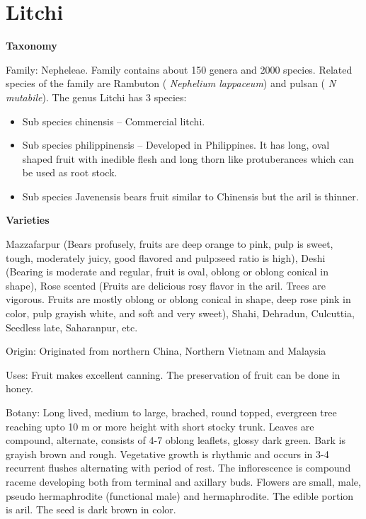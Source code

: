 \documentclass[
  openany]{book}
\providecommand{\tightlist}{%
  \setlength{\itemsep}{0pt}\setlength{\parskip}{0pt}}
\begin{document}
\hypertarget{litchi}{%
\section{Litchi}\label{litchi}}

\textbf{Taxonomy}

Family: Nepheleae. Family contains about 150 genera and 2000 species. Related species of the family are Rambuton ( \emph{Nephelium lappaceum}) and pulsan ( \emph{N mutabile}). The genus Litchi has 3 species:

\begin{itemize}
\tightlist
\item
  Sub species chinensis -- Commercial litchi.
\item
  Sub species philippinensis -- Developed in Philippines. It has long, oval shaped fruit with inedible flesh and long thorn like protuberances which can be used as root stock.
\item
  Sub species Javenensis bears fruit similar to Chinensis but the aril is thinner.
\end{itemize}

\textbf{Varieties}

Mazzafarpur (Bears profusely, fruits are deep orange to pink, pulp is sweet, tough, moderately juicy, good flavored and pulp:seed ratio is high), Deshi (Bearing is moderate and regular, fruit is oval, oblong or oblong conical in shape), Rose scented (Fruits are delicious rosy flavor in the aril. Trees are vigorous. Fruits are mostly oblong or oblong conical in shape, deep rose pink in color, pulp grayish white, and soft and very sweet), Shahi, Dehradun, Culcuttia, Seedless late, Saharanpur, etc.

Origin: Originated from northern China, Northern Vietnam and Malaysia

Uses: Fruit makes excellent canning. The preservation of fruit can be done in honey.

Botany: Long lived, medium to large, brached, round topped, evergreen tree reaching upto 10 m or more height with short stocky trunk. Leaves are compound, alternate, consists of 4-7 oblong leaflets, glossy dark green. Bark is grayish brown and rough. Vegetative growth is rhythmic and occurs in 3-4 recurrent flushes alternating with period of rest. The inflorescence is compound raceme developing both from terminal and axillary buds. Flowers are small, male, pseudo hermaphrodite (functional male) and hermaphrodite. The edible portion is aril. The seed is dark brown in color.
\end{document}
